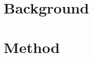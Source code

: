 \documentclass{article}  %
\begin{document}



% 

\section{Background}



\section{Method}




% 


% 


% 
\end{document}
